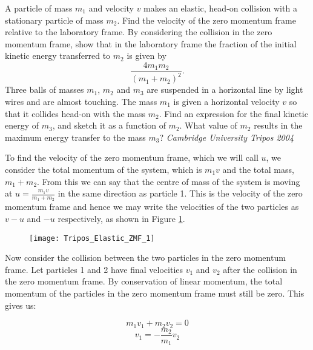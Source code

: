 %
%
\begin{problem} %
 {A particle of mass $m_{1}$ and velocity $v$ makes an elastic, head-on collision with a stationary particle of mass $m_{2}$.  Find the velocity of the zero momentum frame relative to the laboratory frame.  By considering the collision in the zero momentum frame, show that in the laboratory frame the fraction of the initial kinetic energy transferred to $m_{2}$ is given by
 \begin{equation}
  \frac{4m_{1}m_{2}}{(m_{1}+m_{2})^{2}}.
 \end{equation}
Three balls of masses $m_{1}$, $m_{2}$ and $m_{3}$ are suspended in a horizontal line by light wires and are almost touching.  The mass $m_{1}$ is given a horizontal velocity $v$ so that it collides head-on with the mass $m_{2}$.  Find an expression for the final kinetic energy of $m_{3}$, and sketch it as a function of $m_{2}$.  What value of $m_{2}$ results in the maximum energy transfer to the mass $m_{3}$?}
{\textit{Cambridge University Tripos 2004}}
{
To find the velocity of the zero momentum frame, which we will call $u$, we consider the total momentum of the system, which is $m_1 v$ and the total mass, $m_1 + m_2$. From this we can say that the centre of mass of the system is moving at $u=\frac{m_1 v}{m_1 + m_2}$ in the same direction as particle 1. This is the velocity of the zero momentum frame and hence we may write the velocities of the two particles as $v-u$ and $-u$ respectively, as shown in Figure \ref{fig:Tripos_Elastic_ZMF_1}.

\begin{figure}[h]
	\centering
	\texttt{[image: Tripos\_Elastic\_ZMF\_1]}
	\caption{}
	\label{fig:Tripos_Elastic_ZMF_1}
\end{figure}

Now consider the collision between the two particles in the zero momentum frame. Let particles 1 and 2 have final velocities $v_1$ and $v_2$ after the collision in the zero momentum frame. By conservation of linear momentum, the total momentum of the particles in the zero momentum frame must still be zero. This gives us:

\begin{equation*}m_1 v_1 + m_2 v_2=0\end{equation*}
\begin{equation}v_1=-\frac{m_2}{m_1}v_2\end{equation}

}
\end{problem}
